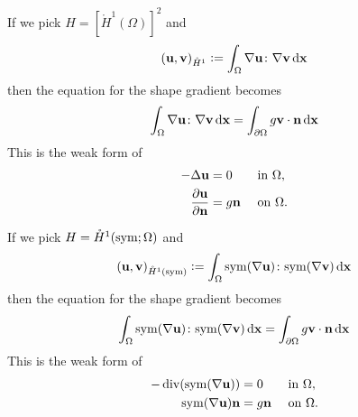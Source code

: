\documentclass[aspectratio=1610]{beamer}
\begin{document}
\begin{frame}
    \begin{example}
        If we pick $H=[\mathring{H}^1(\Omega)]^2$ and 
            \begin{equation}
                (\mathbf{u}, \mathbf{v})_{\mathring{H}^1} \vcentcolon= \int_{\Omega} \nabla \mathbf{u}\colon \nabla \mathbf{v} \operatorname{d}\!{\mathbf{x}}
            \end{equation}
            then the equation for the shape gradient becomes
            \begin{equation}
                \int_{\Omega} \nabla \mathbf{u}\colon \nabla \mathbf{v} \operatorname{d}\!{\mathbf{x}} = \int_{\partial\Omega} g\mathbf{v}\cdot\mathbf{n}\operatorname{d}\!{\mathbf{x}}
            \end{equation}
            This is the weak form of 
            \begin{equation}
                \begin{aligned}
                    - \Delta \mathbf{u} &= 0 && \text{ in }\Omega,\\
                    \frac{\partial\mathbf{u}}{\partial\mathbf{n}} &= g\mathbf{n} && \text{ on }\Omega.
                \end{aligned}
            \end{equation}
    \end{example}
\end{frame}
\begin{frame}
    \begin{example}
        If we pick $H=\mathring{H}^1(\mathrm{sym}; \Omega)$ and 
            \begin{equation}
                (\mathbf{u}, \mathbf{v})_{\mathring{H}^1(\mathrm{sym})} \vcentcolon= \int_{\Omega} \mathrm{sym}(\nabla \mathbf{u})\colon \mathrm{sym}(\nabla \mathbf{v}) \operatorname{d}\!{\mathbf{x}}
            \end{equation}
            then the equation for the shape gradient becomes
            \begin{equation}
                \int_{\Omega} \mathrm{sym}(\nabla \mathbf{u})\colon \mathrm{sym}(\nabla \mathbf{v}) \operatorname{d}\!{\mathbf{x}} = \int_{\partial\Omega} g\mathbf{v}\cdot\mathbf{n}\operatorname{d}\!{\mathbf{x}}
            \end{equation}
            This is the weak form of 
            \begin{equation}
                \begin{aligned}
                    - \operatorname{div}(\mathrm{sym}(\nabla \mathbf{u})) &= 0 && \text{ in }\Omega,\\
                    \mathrm{sym}(\nabla \mathbf{u}) \mathbf{n} &= g\mathbf{n} && \text{ on }\Omega.
                \end{aligned}
            \end{equation}
    \end{example}
\end{frame}
\end{document}

